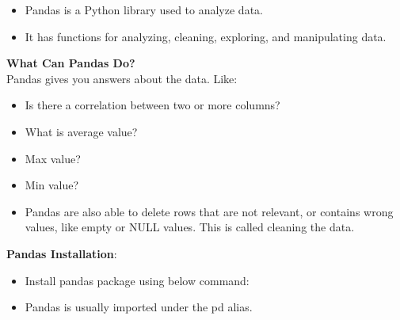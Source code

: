 \setlength{\columnsep}{3pt}
\begin{flushleft}
	
	\begin{itemize}
		\item Pandas is a Python library used to analyze data.
		\item It has functions for analyzing, cleaning, exploring, and manipulating data.		
	
	\end{itemize}

	\textbf{What Can Pandas Do?} \\
	Pandas gives you answers about the data. Like:
	\begin{itemize}
		\item Is there a correlation between two or more columns?
		\item What is average value?
		\item Max value?
		\item Min value?
		\item Pandas are also able to delete rows that are not relevant, or contains wrong values, like empty or NULL values. This is called cleaning the data.
		
	\end{itemize}
	
	\textbf{Pandas Installation}:
	\begin{itemize}
		\item Install pandas package using below command:
		\bigskip
	
		\item Pandas is usually imported under the pd alias.
		\bigskip
		
	\end{itemize}
	
	
	
	

\end{flushleft}

\newpage

